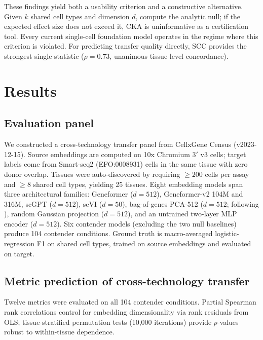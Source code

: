 \documentclass[11pt]{article}
\begin{document}
These findings yield both a usability criterion and a constructive
alternative. Given $k$ shared cell types and dimension $d$, compute the
analytic null; if the expected effect size does not exceed it, CKA is
uninformative as a certification tool. Every current single-cell
foundation model operates in the regime where this criterion is
violated. For predicting transfer quality directly, SCC provides the
strongest single statistic ($\rho = 0.73$, unanimous tissue-level
concordance).


\section{Results}

\subsection{Evaluation panel}
\label{sec:panel}

We constructed a cross-technology transfer panel from CellxGene Census
(v2023-12-15). Source embeddings are computed on 10x Chromium 3$'$ v3
cells; target labels come from Smart-seq2 (EFO:0008931) cells in the
same tissue with zero donor overlap. Tissues were auto-discovered by
requiring $\geq 200$ cells per assay and $\geq 8$ shared cell types,
yielding 25 tissues. Eight embedding models
span three architectural families: Geneformer \citep{theodoris2023geneformer}
($d = 512$), Geneformer-v2 104M and 316M, scGPT \citep{cui2024scgpt}
($d = 512$), scVI \citep{lopez2018scvi} ($d = 50$), bag-of-genes
PCA-512 ($d = 512$; following \citealp{cole2026morpheus}), random
Gaussian projection ($d = 512$), and an untrained two-layer MLP encoder
($d = 512$). Six contender models (excluding the two null baselines)
produce 104 contender conditions. Ground truth is macro-averaged
logistic-regression F1 on shared cell types, trained on source
embeddings and evaluated on target.


\subsection{Metric prediction of cross-technology transfer}
\label{sec:prediction}

Twelve metrics were evaluated on all 104 contender conditions. Partial
Spearman rank correlations control for embedding dimensionality via rank
residuals from OLS; tissue-stratified permutation tests (10,000
iterations) provide $p$-values robust to within-tissue dependence.
\end{document}

